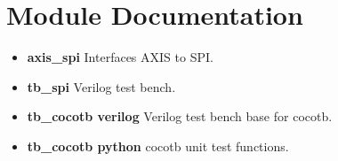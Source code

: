 \newpage

\section{Module Documentation} \label{Module Documentation}

\begin{itemize}
  \item \textbf{axis\_spi} Interfaces AXIS to SPI.\\
  \item \textbf{tb\_spi} Verilog test bench.\\
  \item \textbf{tb\_cocotb verilog} Verilog test bench base for cocotb.\\
  \item \textbf{tb\_cocotb python} cocotb unit test functions.\\
\end{itemize}


